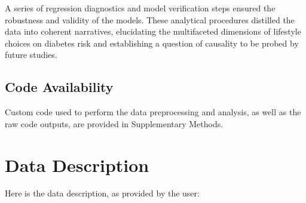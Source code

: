 \documentclass[11pt]{article}
\begin{document}
A series of regression diagnostics and model verification steps ensured the robustness and validity of the models. These analytical procedures distilled the data into coherent narratives, elucidating the multifaceted dimensions of lifestyle choices on diabetes risk and establishing a question of causality to be probed by future studies.\subsection*{Code Availability}

Custom code used to perform the data preprocessing and analysis, as well as the raw code outputs, are provided in Supplementary Methods.






\clearpage
\appendix

\section{Data Description} \label{sec:data_description} Here is the data description, as provided by the user:
\end{document}
